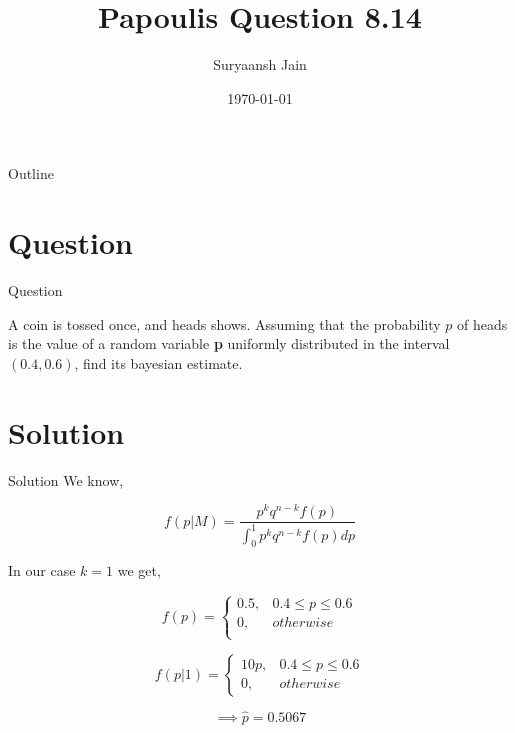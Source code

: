 \documentclass{beamer}
\title{Papoulis Question 8.14}
\author{Suryaansh Jain}
\date{\today}
\begin{document}
\begin{frame}
    \titlepage 
\end{frame}

\logo{}


\begin{frame}{Outline}
    \tableofcontents
\end{frame}


\section{Question}
\begin{frame}{Question}

A coin is tossed once, and heads shows. Assuming that the probability $p$ of heads is the value of a random variable \textbf{p} uniformly distributed in the interval $(0.4, 0.6)$, find its bayesian estimate.
\end{frame}

\section{Solution}
\begin{frame}{Solution}
We know,

\begin{equation}
    f(p|M) = \frac{p^k q^{n-k} f(p)}{\int _{0} ^ {1} {p^k q^{n-k} f(p)dp}}
\end{equation}

In our case $k = 1$ we get,

\begin{equation}
    f(p) = \begin{cases}
            0.5, & 0.4 \leq p \leq 0.6 \\
            0, & otherwise \\
        \end{cases}
\end{equation}

\begin{equation}
    f(p|1) = \begin{cases}
            10p, & 0.4 \leq p \leq 0.6 \\
            0, & otherwise
        \end{cases}
\end{equation}

\begin{equation}
    \implies \hat{p} = 0.5067
\end{equation}
    
\end{frame}
\end{document}
